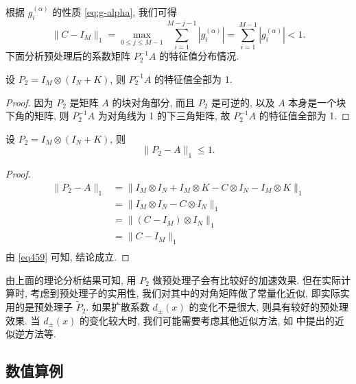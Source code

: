\documentclass{ecnumaster}
\begin{document}
根据 $g_i^{(\alpha)}$ 的性质 \eqref{eq:g-alpha}, 我们可得
\begin{equation}\label{eq459}
  \| C - I_M \|_{1} = \max _{0 \leq j \leq M-1} \sum _{i = 1}^{M-j-1} |g_{i}^{(\alpha)}|
  = \sum _{i = 1}^{M-1} |g_{i}^{(\alpha)}|
  < 1.
\end{equation}
%
下面分析预处理后的系数矩阵 $P_2^{-1}A$ 的特征值分布情况. %
\begin{theorem}
  设 $P_2 = I_M \otimes (I_N + K)$, 则 $P_2^{-1}A$ 的特征值全部为 1.
\end{theorem}
\begin{proof}
  因为 $P_2$ 是矩阵 $A$ 的块对角部分,
  而且 $P_2$ 是可逆的,
  以及 $A$ 本身是一个块下角的矩阵,
  则 $P_2^{-1}A$ 为对角线为 1 的下三角矩阵,
  故 $P_2^{-1}A$ 的特征值全部为 1.
\end{proof}

\begin{theorem}
  设 $P_2 = I_M \otimes (I_N + K)$, 则
  \begin{equation}
    \| P_2 - A \| _1 \leq 1.
  \end{equation}
\end{theorem}
\begin{proof}
  \begin{equation}
    \begin{split}
      \| P_2 - A \| _1 &= \| I_M \otimes I_N + I_M \otimes K - C \otimes I_N - I_M \otimes K\| _1\\
                     &= \| I_M \otimes I_N - C \otimes I_N \| _1 \\
                     &= \| (C - I_M) \otimes I_N \| _1 \\
                     &= \| C - I_M \| _1\\
    \end{split}
  \end{equation}
  由 \eqref{eq459} 可知, 结论成立.
\end{proof}

由上面的理论分析结果可知, 用 $P_2$ 做预处理子会有比较好的加速效果.
但在实际计算时, 考虑到预处理子的实用性, 我们对其中的对角矩阵做了常量化近似,
即实际实用的是预处理子 $\tilde{P}_2$.
如果扩散系数 $d_\pm(x)$ 的变化不是很大, 则具有较好的预处理效果.
当 $d_\pm(x)$ 的变化较大时, 我们可能需要考虑其他近似方法,
如 \cite{PKNS14} 中提出的近似逆方法等.

\subsection{数值算例}
\end{document}

